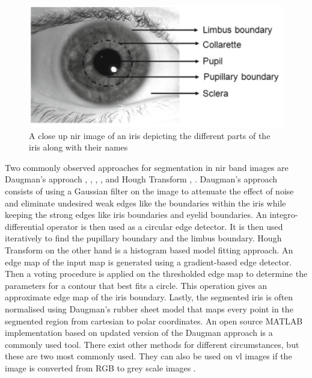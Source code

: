 \begin{figure}[H]
\centering
\includegraphics[width=\textwidth]{figures/iris_naming.png} 
\caption{A close up \gls{nir} image of an iris depicting the different parts of the iris along with their names \citep{Bowyer2016b}}
\label{fig:iris_naming}
\end{figure}

Two commonly observed approaches for segmentation in \gls{nir} band images are Daugman's approach \citep{Daugman1993} , \citep{Saha2017}, \citep{Rattani2017}, \citep{Khan2017}, and Hough Transform \citep{Luhadiya2017}, \citep{Uka2017}. Daugman's approach consists of using a Gaussian filter on the image to attenuate the effect of noise and eliminate undesired weak edges like the boundaries within the iris while keeping the strong edges like iris boundaries and eyelid boundaries. An integro-differential operator is then used as a circular edge detector. It is then used iteratively to find the pupillary boundary and the limbus boundary. Hough Transform on the other hand is a histogram based model fitting approach. An edge map of the input map is generated using a gradient-based edge detector. Then a voting procedure is applied on the thresholded edge map to determine the parameters for a contour that best fits a circle. This operation gives an approximate edge map of the iris boundary. Lastly, the segmented iris is often normalised using Daugman's rubber sheet model that maps every point in the segmented region from cartesian to polar coordinates. An open source MATLAB implementation based on updated version of the Daugman approach is a commonly used tool. There exist other methods for different circumstances, but these are two most commonly used. They can also be used on \gls{vl} images if the image is converted from RGB to grey scale images \citep{Bowyer2016b} . 

